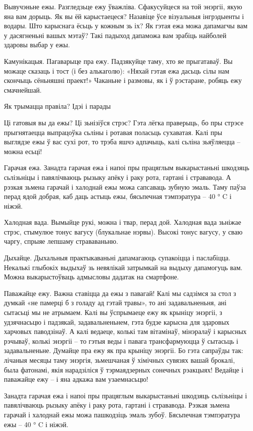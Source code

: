 Вывучэньне ежы.
Разгледзьце ежу ўважліва. Сфакусуйцеся на той энэргіі, якую яна вам дорыць. Як вы ёй карыстаецеся? Назавіце ўсе візуальныя інгрэдыенты і водары. Што карыснага ёсьць у кожным зь іх? Як гэтая ежа можа дапамагчы вам у дасягненьні вашых мэтаў? Такі падыход дапаможа вам зрабіць найболей здаровы выбар у ежы.

Камунікацыя.
Пагаварыце пра ежу. Падзякуйце таму, хто яе прыгатаваў. Вы можаце сказаць і тост (і без алькаголю): «Няхай гэтая ежа дасьць сілы нам скончыць сёньняшні праект!» Чаканьне і размовы, як і ў рэстаране, робяць ежу смачнейшай.

Як трымацца правіла? Ідэі і парады

Ці гатовыя вы да ежы?
Ці зьнізіўся стрэс? Гэта лёгка праверыць, бо пры стрэсе прыгнятаецца выпрацоўка сьліны і ротавая поласьць сухаватая. Калі пры выглядзе ежы ў вас сухі рот, то трэба яшчэ адпачыць, калі сьліна зьяўляецца – можна есьці!

Гарачая ежа.
Занадта гарачая ежа і напоі пры працяглым выкарыстаньні шкодзяць сьлізьніцы і павялічваюць рызыку апёку і раку рота, гартані і стрававода. А рэзкая зьмена гарачай і халоднай ежы можа сапсаваць зубную эмаль. Таму паўза перад ядой добрая, каб даць астыць ежы, бясьпечная тэмпэратура – 40 ° C і ніжэй.

Халодная вада.
Вымыйце рукі, можна і твар, перад дой. Халодная вада зьніжае стрэс, стымулюе тонус вагусу (блукальнае нэрвы). Высокі тонус вагусу, у сваю чаргу, спрыяе лепшаму страваваньню.

Дыхайце.
Дыхальныя практыкаваньні дапамагаюць супакоіцца і паслабіцца. Некалькі глыбокіх выдыхаў зь невялікай затрымкай на выдыху дапамогуць вам. Можна выкарыстоўваць адмысловы дадатак на смартфоне.

Паважайце ежу.
Важна ставіцца да ежы з павагай! Калі мы садзімся за стол з думкай «не памерці б з голаду ад гэтай травы», то ані задавальненьня, ані сытасьці мы не атрымаем. Калі вы ўспрымаеце ежу як крыніцу энэргіі, з удзячнасьцю і падзякай, задавальненьнем, гэта будзе карысна для здаровых харчовых паводзінаў. А калі ведаеце, колькі там вітамінаў, мінэралаў і карысных рэчываў, колькі энэргіі – то гэтыя веды і павага трансфармуюцца ў сытасьць і задавальненьне. Думайце пра ежу як пра крыніцу энэргіі. Бо гэта сапраўды так: лічаныя месяцы таму энэргія, зьмешчаная ў хімічных сувязях вашай брокалі, была фатонамі, якія нарадзіліся ў тэрмаядзерных сонечных рэакцыях! Ведайце і паважайце ежу – і яна адкажа вам узаемнасьцю!

Занадта гарачая ежа і напоі пры працяглым выкарыстаньні шкодзяць сьлізьніцы і павялічваюць рызыку апёку і раку рота, гартані і стрававода. Рэзкая зьмена гарачай і халоднай ежы можа пашкодзіць эмаль зубоў. Бясьпечная тэмпэратура ежы – 40 ° C і ніжэй.

